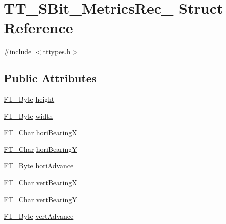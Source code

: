 \hypertarget{struct_t_t___s_bit___metrics_rec__}{\section{T\-T\-\_\-\-S\-Bit\-\_\-\-Metrics\-Rec\-\_\- Struct Reference}
\label{struct_t_t___s_bit___metrics_rec__}
}


{\ttfamily \#include $<$tttypes.\-h$>$}

\subsection*{Public Attributes}
\begin{DoxyCompactItemize}
\item 
\hyperlink{fttypes_8h_a51f26183ca0c9f4af958939648caeccd}{F\-T\-\_\-\-Byte} \hyperlink{struct_t_t___s_bit___metrics_rec___a79b25794122888101aae80c7b74fc1fc}{height}
\item 
\hyperlink{fttypes_8h_a51f26183ca0c9f4af958939648caeccd}{F\-T\-\_\-\-Byte} \hyperlink{struct_t_t___s_bit___metrics_rec___a3444618e2c2a612a662a5e0d2c3f25ef}{width}
\item 
\hyperlink{fttypes_8h_a0f851552b050883885f0a0855771f39d}{F\-T\-\_\-\-Char} \hyperlink{struct_t_t___s_bit___metrics_rec___a786ba1081993e18d514ddf37c2662c7b}{hori\-Bearing\-X}
\item 
\hyperlink{fttypes_8h_a0f851552b050883885f0a0855771f39d}{F\-T\-\_\-\-Char} \hyperlink{struct_t_t___s_bit___metrics_rec___aaed1567b444a1bee4b3478b2cdb9259f}{hori\-Bearing\-Y}
\item 
\hyperlink{fttypes_8h_a51f26183ca0c9f4af958939648caeccd}{F\-T\-\_\-\-Byte} \hyperlink{struct_t_t___s_bit___metrics_rec___a8b0c5271aaf220f7a8cbf4838854e220}{hori\-Advance}
\item 
\hyperlink{fttypes_8h_a0f851552b050883885f0a0855771f39d}{F\-T\-\_\-\-Char} \hyperlink{struct_t_t___s_bit___metrics_rec___a626e67e02494faab653a7543bb0b7c79}{vert\-Bearing\-X}
\item 
\hyperlink{fttypes_8h_a0f851552b050883885f0a0855771f39d}{F\-T\-\_\-\-Char} \hyperlink{struct_t_t___s_bit___metrics_rec___aef4755ed22ba72e5fa304920bae03146}{vert\-Bearing\-Y}
\item 
\hyperlink{fttypes_8h_a51f26183ca0c9f4af958939648caeccd}{F\-T\-\_\-\-Byte} \hyperlink{struct_t_t___s_bit___metrics_rec___a947468e42759089d0b5c5fa10a0defdf}{vert\-Advance}
\end{DoxyCompactItemize}


